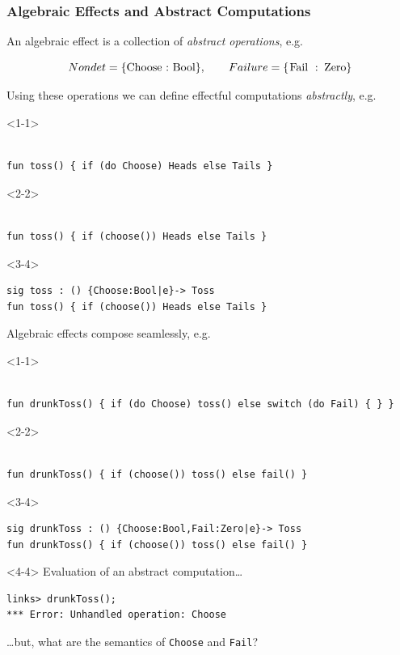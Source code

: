 \documentclass[10pt,compress]{beamer}
\begin{document}
\begin{frame}[fragile]
\frametitle{Algebraic Effects and Abstract Computations}
An algebraic effect is a collection of \emph{abstract operations}, e.g.

\[ 
Nondet = \{\text{\lstinline$Choose : Bool$}\}, \qquad Failure = \{\text{\lstinline$Fail : Zero$}\}
\]

Using these operations we can define effectful computations \emph{abstractly}, e.g.
\begin{onlyenv}<1-1>
\begin{lstlisting}

fun toss() { if (do Choose) Heads else Tails }
\end{lstlisting}
\end{onlyenv}
%
\begin{onlyenv}<2-2>
\begin{lstlisting}

fun toss() { if (choose()) Heads else Tails }
\end{lstlisting}
\end{onlyenv}
%
\begin{onlyenv}<3-4>
\begin{lstlisting}
sig toss : () {Choose:Bool|e}-> Toss
fun toss() { if (choose()) Heads else Tails }
\end{lstlisting}
\end{onlyenv}
%

Algebraic effects compose seamlessly, e.g.
\begin{onlyenv}<1-1>
\begin{lstlisting}

fun drunkToss() { if (do Choose) toss() else switch (do Fail) { } }
\end{lstlisting}
\end{onlyenv}
%
\begin{onlyenv}<2-2>
\begin{lstlisting}

fun drunkToss() { if (choose()) toss() else fail() }
\end{lstlisting}
\end{onlyenv}
%
\begin{onlyenv}<3-4>
\begin{lstlisting}
sig drunkToss : () {Choose:Bool,Fail:Zero|e}-> Toss
fun drunkToss() { if (choose()) toss() else fail() }
\end{lstlisting}
\end{onlyenv}

\begin{uncoverenv}<4-4>
Evaluation of an abstract computation\dots
\begin{lstlisting}[style=terminal]
links> drunkToss();
*** Error: Unhandled operation: Choose
\end{lstlisting}
\dots but, what are the semantics of \lstinline$Choose$ and \lstinline$Fail$?
\end{uncoverenv}

\end{frame}
\end{document}
